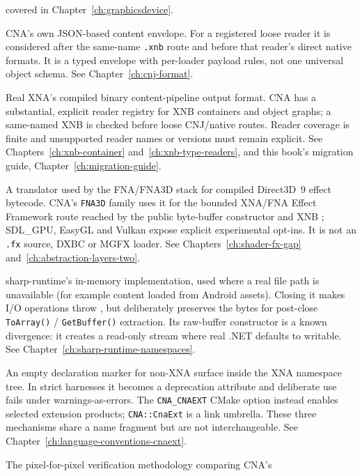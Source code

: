 \begin{description}
  covered in Chapter~\ref{ch:graphicsdevice}.
\item[.cnj] CNA's own JSON-based content envelope. For a registered loose reader it is considered
  after the same-name \texttt{.xnb} route and before that reader's direct native formats. It is a
  typed envelope with per-loader payload rules, not one universal object schema. See
  Chapter~\ref{ch:cnj-format}.
\item[.xnb] Real XNA's compiled binary content-pipeline output format. CNA has a substantial,
  explicit reader registry for XNB containers and object graphs; a same-named XNB is checked
  before loose CNJ/native routes. Reader coverage is finite and unsupported reader names or
  versions must remain explicit. See Chapters~\ref{ch:xnb-container} and~\ref{ch:xnb-type-readers}, and this book's migration
  guide, Chapter~\ref{ch:migration-guide}.
\item[MojoShader] A translator used by the FNA/FNA3D stack for compiled Direct3D~9 effect
  bytecode. CNA's \texttt{FNA3D} family uses it for the bounded XNA/FNA Effect Framework route
  reached by the public byte-buffer constructor and XNB ; SDL\_GPU,
  EasyGL and Vulkan expose explicit experimental opt-ins. It is not an \texttt{.fx} source,
  DXBC or MGFX loader. See Chapters~\ref{ch:shader-fx-gap} and~\ref{ch:abstraction-layers-two}.
\item[MemoryStream] sharp-runtime's in-memory  implementation, used where
  a real file path is unavailable (for example content loaded from Android assets). Closing it
  makes I/O operations throw , but deliberately preserves the
  bytes for post-close \texttt{ToArray()} / \texttt{GetBuffer()} extraction. Its raw-buffer
  constructor is a known divergence: it creates a read-only stream where real .NET defaults to
  writable. See Chapter~\ref{ch:sharp-runtime-namespaces}.
\item[CNAEXT] An empty declaration marker for non-XNA surface inside the XNA namespace tree. In
  strict harnesses it becomes a deprecation attribute and deliberate use fails under
  warnings-as-errors. The \texttt{CNA\_CNAEXT} CMake option instead enables selected extension
  products; \texttt{CNA::CnaExt} is a link umbrella. These three mechanisms share a name fragment
  but are not interchangeable. See Chapter~\ref{ch:language-conventions-cnaext}.
\item[Oracle (D3D9)] The pixel-for-pixel verification methodology comparing CNA's

\end{description}
